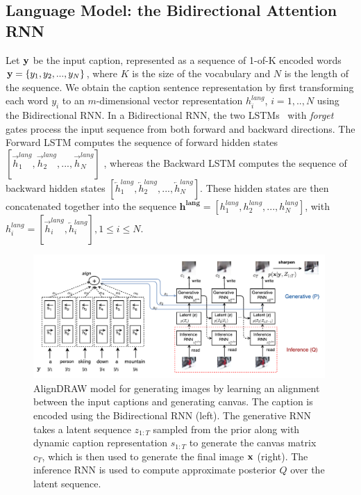 \documentclass{article} %
\newcommand{\hlang}{h^{lang}}
\newcommand{\hlangall}{\boldsymbol{h^{lang}}}
\newcommand{\icaption}{{\bf{y}}}
\newcommand{\oimage}{{\bf{x}}}
\begin{document}
\subsection{Language Model: the Bidirectional Attention RNN}
\vspace{-0.05in}
\label{sec:lang}
Let $\icaption$ be the input caption, represented as a sequence
of 1-of-K encoded words 
${\bf y} = \{y_{1}, y_{2}, ..., y_{N}\}$, 
where $K$ is the size of the vocabulary and $N$ is the length of the sequence.
We obtain the caption sentence representation by first 
transforming each word $y_{i}$ to an $m$-dimensional 
vector representation $\hlang_{i}$, $i=1,..,N$ using the Bidirectional RNN. In a Bidirectional RNN, the two LSTMs~\citep{hochreiter_lstm} with \textit{forget} gates 
\citep{gers_forget} process the input sequence from both forward and backward directions. The Forward LSTM computes the sequence of forward hidden states $[\overrightarrow{h}^{lang}_{1}, \overrightarrow{h}^{lang}_{2}, ..., \overrightarrow{h}^{lang}_{N}]$ , whereas the Backward LSTM computes the sequence of backward hidden states $[\overleftarrow{h}^{lang}_{1}, \overleftarrow{h}^{lang}_{2}, ..., \overleftarrow{h}^{lang}_{N}]$. 
These hidden states are then concatenated together 
into the sequence $\hlangall = [\hlang_{1}, \hlang_{2}, ..., \hlang_{N}]$, 
with $\hlang_{i} = [\overrightarrow{h}^{lang}_{i}, \overleftarrow{h}^{lang}_{i}], 1\leq i\leq N$.


\begin{figure}[t!]
\vspace{-0.3in}
\captionsetup[subfigure]{labelformat=empty}
\begin{center}
\includegraphics[width=0.99\textwidth]{figures/alignDrawAnnotated.pdf}\quad
%
\end{center}
\vspace{-0.1in}
\caption{\small AlignDRAW model for generating images by learning an alignment between the input captions
and generating canvas. The caption is encoded using 
the Bidirectional RNN (left). The generative RNN takes a latent sequence $z_{1:T}$ sampled from the 
prior along with dynamic caption representation $s_{1:T}$ to generate the canvas matrix $c_T$, which is then
used to generate the final image $\oimage$ (right).
The inference RNN is used to compute approximate posterior $Q$ over the latent sequence.} 
\label{fig:figmodel}
\vspace{-0.2in}
\end{figure}
\end{document}
